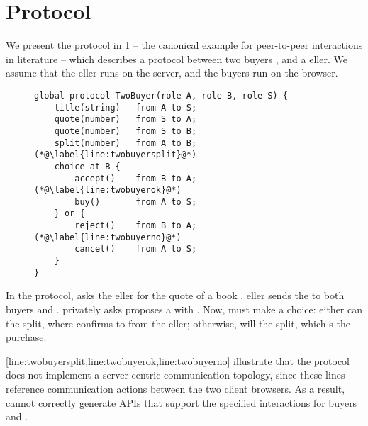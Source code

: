 \section{ Protocol}
\label{section:twobuyer}

We present the  protocol in \cref{lst:twobuyer}
-- the canonical example for peer-to-peer interactions in
literature \cite{JACM2016,MPAST} --
which describes a protocol between two buyers , 
and a eller.
We assume that the eller runs on
the server, and the buyers run on the browser.

\begin{figure}[!ht]
\begin{lstlisting}[language=scribble]
global protocol TwoBuyer(role A, role B, role S) {
	title(string)   from A to S;
	quote(number)   from S to A;
	quote(number)   from S to B;
	split(number)   from A to B; (*@\label{line:twobuyersplit}@*)
	choice at B {
		accept()    from B to A; (*@\label{line:twobuyerok}@*)
		buy()       from A to S;
	} or {
		reject()    from B to A; (*@\label{line:twobuyerno}@*)
		cancel()    from A to S;
	}
}
\end{lstlisting}
\label{lst:twobuyer}
\end{figure}

In the protocol,  asks the eller for the quote
of a book . eller sends the 
to both buyers  and .  privately asks
proposes a  with . Now,  must make
a choice: 
either  can  the split, where  confirms
to  from the eller;
otherwise,  will  the split, which
s the purchase.

\cref{line:twobuyersplit,line:twobuyerok,line:twobuyerno}
illustrate that the  protocol 
does not implement a server-centric communication topology,
since these lines reference communication actions between
the two client browsers. 
As a result,  cannot correctly generate
APIs that support the specified interactions 
for buyers  and .
